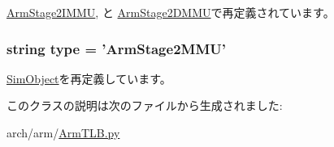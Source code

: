 \hyperlink{classArmTLB_1_1ArmStage2IMMU_aca6615da7b6b14e4b80293f21e77790c}{ArmStage2IMMU}, と \hyperlink{classArmTLB_1_1ArmStage2DMMU_aca6615da7b6b14e4b80293f21e77790c}{ArmStage2DMMU}で再定義されています。\hypertarget{classArmTLB_1_1ArmStage2MMU_acce15679d830831b0bbe8ebc2a60b2ca}{
\subsubsection[{type}]{\setlength{\rightskip}{0pt plus 5cm}string {\bf type} = '{\bf ArmStage2MMU}'}}
\label{classArmTLB_1_1ArmStage2MMU_acce15679d830831b0bbe8ebc2a60b2ca}


\hyperlink{classm5_1_1SimObject_1_1SimObject_acce15679d830831b0bbe8ebc2a60b2ca}{SimObject}を再定義しています。

このクラスの説明は次のファイルから生成されました:\begin{DoxyCompactItemize}
\item 
arch/arm/\hyperlink{ArmTLB_8py}{ArmTLB.py}\end{DoxyCompactItemize}
